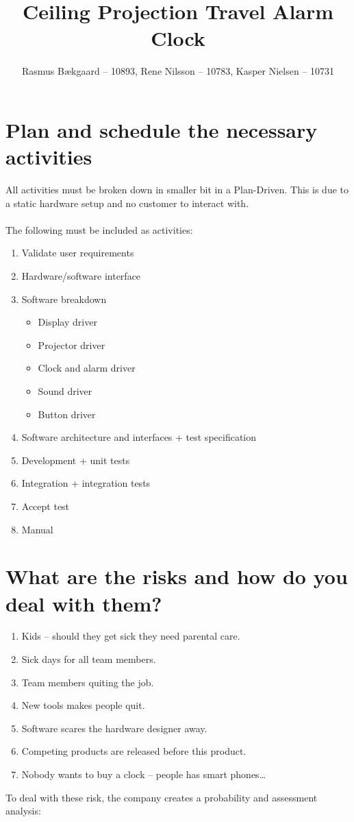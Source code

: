 \documentclass[10pt, a4]{article}
\title{Ceiling Projection Travel Alarm Clock}
\author{Rasmus Bækgaard -- 10893, Rene Nilsson -- 10783, Kasper Nielsen -- 10731}
\begin{document}
\maketitle


\section{Plan and schedule the necessary activities} 

All activities must be broken down in smaller bit in a Plan-Driven.
This is due to a static hardware setup and no customer to interact with.
\\
\\
The following must be included as activities:
\begin{enumerate}
	\item Validate user requirements
	\item Hardware/software interface
	\item Software breakdown
	\begin{itemize}
		\item Display driver
		\item Projector driver
		\item Clock and alarm driver
		\item Sound driver
		\item Button driver
	\end{itemize}
	\item Software architecture and interfaces + test specification
	\item Development + unit tests
	\item Integration + integration tests
	\item Accept test
	\item Manual
\end{enumerate}



\section{What are the risks and how do you deal with them?}

\begin{enumerate}
	\item Kids -- should they get sick they need parental care.
	\item Sick days for all team members.
	\item Team members quiting the job.
	\item New tools makes people quit.
	\item Software scares the hardware designer away.
	\item Competing products are released before this product.
	\item Nobody wants to buy a clock -- people has smart phones\dots
\end{enumerate}
To deal with these risk, the company creates a probability and assessment analysis:
\end{document}
